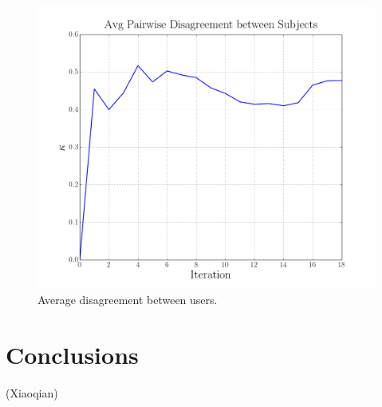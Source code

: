 \documentclass[twoside,11pt]{article}
\begin{document}
\begin{figure}
\centering
\includegraphics[scale=0.5]{dis.png} 
\caption{Average disagreement between users.}\label{fig:dis}

\end{figure}
\section{Conclusions} \label{sec:conclusions}
(Xiaoqian)


\end{document}
